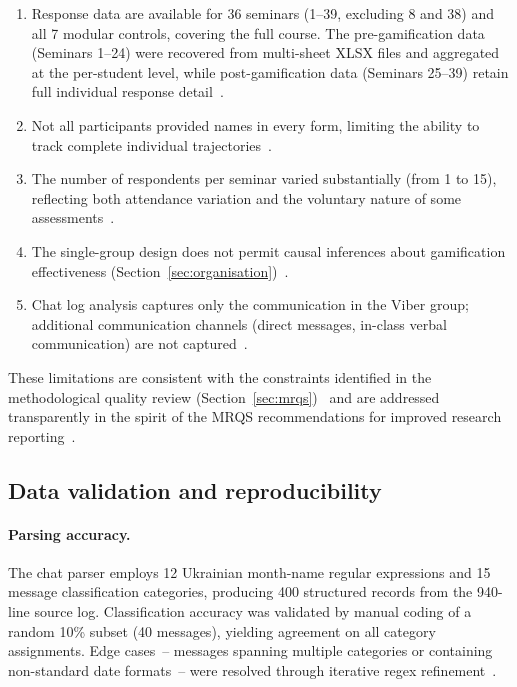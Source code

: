 \begin{enumerate}
\item Response data are available for 36 seminars (1--39, excluding 8 and 38) and all 7 modular controls, covering the full course. The pre-gamification data (Seminars 1--24) were recovered from multi-sheet XLSX files and aggregated at the per-student level, while post-gamification data (Seminars 25--39) retain full individual response detail~\cite{Korniienko2025mrqs}.
\item Not all participants provided names in every form, limiting the ability to track complete individual trajectories~\cite{petticrew2008systematic, Kivits2013}.
\item The number of respondents per seminar varied substantially (from 1 to 15), reflecting both attendance variation and the voluntary nature of some assessments~\cite{munn2018systematic}.
\item The single-group design does not permit causal inferences about gamification effectiveness (Section~\ref{sec:organisation})~\cite{Hamari2014, DichevDicheva2017}.
\item Chat log analysis captures only the communication in the Viber group; additional communication channels (direct messages, in-class verbal communication) are not captured~\cite{creswell}.
\end{enumerate}

These limitations are consistent with the constraints identified in the methodological quality review (Section~\ref{sec:mrqs})~\cite{Korniienko2025mrqs} and are addressed transparently in the spirit of the MRQS recommendations for improved research reporting~\cite{Page2021, Campbell2020}.

\subsection{Data validation and reproducibility} \label{sec:validation}

\paragraph{Parsing accuracy.}
The chat parser employs 12 Ukrainian month-name regular expressions and 15 message classification categories, producing 400 structured records from the 940-line source log. Classification accuracy was validated by manual coding of a random 10\% subset (40 messages), yielding agreement on all category assignments. Edge cases~-- messages spanning multiple categories or containing non-standard date formats~-- were resolved through iterative regex refinement~\cite{Thomas2008}.

